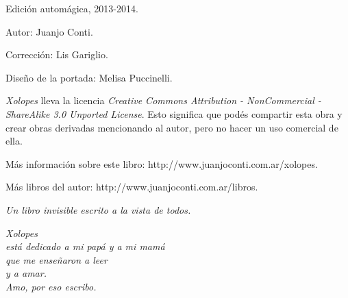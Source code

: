 \documentclass[12pt,twoside,openright,a5paper]{book}
\begin{document}

\pagestyle{plain}



\cleardoublepage

\thispagestyle{empty}
\noindent
Edición automágica, 2013-2014.\\

\vspace{0.5cm}

\noindent
Autor: Juanjo Conti.

\noindent
Corrección: Lis Gariglio.

\noindent
Diseño de la portada: Melisa Puccinelli.


\vspace{1cm}

\noindent
\emph{Xolopes} lleva la licencia 
\emph{Creative Commons Attribution - NonCommercial - ShareAlike 3.0 Unported License}.
Esto significa que podés compartir esta obra y crear obras derivadas
mencionando al autor, pero no ha\-cer un uso comercial de ella.

\vfill

\noindent
Más información sobre este libro: http://www.juanjoconti.com.ar/xolopes.

\vspace{0.5cm}
\noindent
Más libros del autor: http://www.juanjoconti.com.ar/libros.

\cleardoublepage

\begin{center}
\vspace*{\fill}
\emph{Un libro invisible escrito a la vista de todos.}
\vspace*{\fill}
\end{center}

\cleardoublepage

\noindent
\begin{flushright}
\emph{
\emph{Xolopes} \\está dedicado a mi papá y a mi mamá\\
que me enseñaron a leer \\y a amar.\\
\vspace{0.5cm}
Amo, por eso escribo.
}

\end{flushright}

\cleardoublepage
\end{document}
